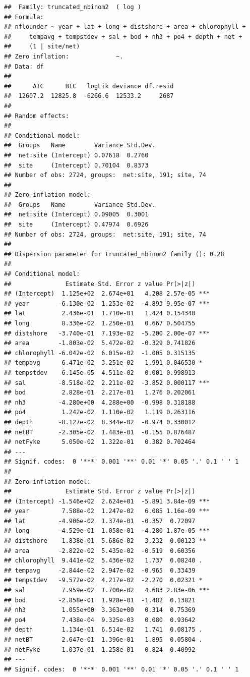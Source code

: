 \documentclass[
]{article}
\begin{document}
\begin{verbatim}
##  Family: truncated_nbinom2  ( log )
## Formula:          
## nflounder ~ year + lat + long + distshore + area + chlorophyll +  
##     tempavg + tempstdev + sal + bod + nh3 + po4 + depth + net +  
##     (1 | site/net)
## Zero inflation:             ~.
## Data: df
## 
##      AIC      BIC   logLik deviance df.resid 
##  12607.2  12825.8  -6266.6  12533.2     2687 
## 
## Random effects:
## 
## Conditional model:
##  Groups   Name        Variance Std.Dev.
##  net:site (Intercept) 0.07618  0.2760  
##  site     (Intercept) 0.70104  0.8373  
## Number of obs: 2724, groups:  net:site, 191; site, 74
## 
## Zero-inflation model:
##  Groups   Name        Variance Std.Dev.
##  net:site (Intercept) 0.09005  0.3001  
##  site     (Intercept) 0.47974  0.6926  
## Number of obs: 2724, groups:  net:site, 191; site, 74
## 
## Dispersion parameter for truncated_nbinom2 family (): 0.28 
## 
## Conditional model:
##               Estimate Std. Error z value Pr(>|z|)    
## (Intercept)  1.125e+02  2.674e+01   4.208 2.57e-05 ***
## year        -6.130e-02  1.253e-02  -4.893 9.95e-07 ***
## lat          2.436e-01  1.710e-01   1.424 0.154340    
## long         8.336e-02  1.250e-01   0.667 0.504755    
## distshore   -3.740e-01  7.193e-02  -5.200 2.00e-07 ***
## area        -1.803e-02  5.472e-02  -0.329 0.741826    
## chlorophyll -6.042e-02  6.015e-02  -1.005 0.315135    
## tempavg      6.471e-02  3.251e-02   1.991 0.046530 *  
## tempstdev    6.145e-05  4.511e-02   0.001 0.998913    
## sal         -8.518e-02  2.211e-02  -3.852 0.000117 ***
## bod          2.828e-01  2.217e-01   1.276 0.202061    
## nh3         -4.280e+00  4.288e+00  -0.998 0.318188    
## po4          1.242e-02  1.110e-02   1.119 0.263116    
## depth       -8.127e-02  8.344e-02  -0.974 0.330012    
## netBT       -2.305e-02  1.483e-01  -0.155 0.876487    
## netFyke      5.050e-02  1.322e-01   0.382 0.702464    
## ---
## Signif. codes:  0 '***' 0.001 '**' 0.01 '*' 0.05 '.' 0.1 ' ' 1
## 
## Zero-inflation model:
##               Estimate Std. Error z value Pr(>|z|)    
## (Intercept) -1.546e+02  2.624e+01  -5.891 3.84e-09 ***
## year         7.588e-02  1.247e-02   6.085 1.16e-09 ***
## lat         -4.906e-02  1.374e-01  -0.357  0.72097    
## long        -4.529e-01  1.058e-01  -4.280 1.87e-05 ***
## distshore    1.838e-01  5.686e-02   3.232  0.00123 ** 
## area        -2.822e-02  5.435e-02  -0.519  0.60356    
## chlorophyll  9.441e-02  5.436e-02   1.737  0.08240 .  
## tempavg     -2.844e-02  2.947e-02  -0.965  0.33439    
## tempstdev   -9.572e-02  4.217e-02  -2.270  0.02321 *  
## sal          7.959e-02  1.700e-02   4.683 2.83e-06 ***
## bod         -2.858e-01  1.928e-01  -1.482  0.13821    
## nh3          1.055e+00  3.363e+00   0.314  0.75369    
## po4          7.438e-04  9.325e-03   0.080  0.93642    
## depth        1.134e-01  6.514e-02   1.741  0.08175 .  
## netBT        2.647e-01  1.396e-01   1.895  0.05804 .  
## netFyke      1.037e-01  1.258e-01   0.824  0.40992    
## ---
## Signif. codes:  0 '***' 0.001 '**' 0.01 '*' 0.05 '.' 0.1 ' ' 1
\end{verbatim}
\end{document}
